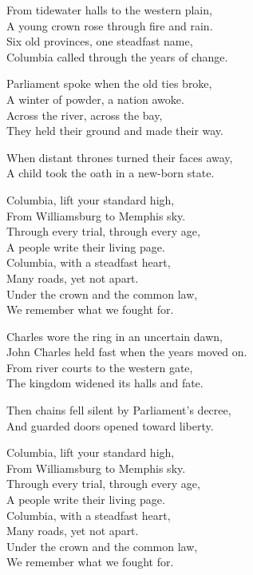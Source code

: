 \begin{lyrics}
From tidewater halls to the western plain,\\
A young crown rose through fire and rain.\\
Six old provinces, one steadfast name,\\
Columbia called through the years of change.

Parliament spoke when the old ties broke,\\
A winter of powder, a nation awoke.\\
Across the river, across the bay,\\
They held their ground and made their way.

When distant thrones turned their faces away,\\
A child took the oath in a new-born state.

Columbia, lift your standard high,\\
From Williamsburg to Memphis sky.\\
Through every trial, through every age,\\
A people write their living page.\\
Columbia, with a steadfast heart,\\
Many roads, yet not apart.\\
Under the crown and the common law,\\
We remember what we fought for.

Charles wore the ring in an uncertain dawn,\\
John Charles held fast when the years moved on.\\
From river courts to the western gate,\\
The kingdom widened its halls and fate.

Then chains fell silent by Parliament's decree,\\
And guarded doors opened toward liberty.

Columbia, lift your standard high,\\
From Williamsburg to Memphis sky.\\
Through every trial, through every age,\\
A people write their living page.\\
Columbia, with a steadfast heart,\\
Many roads, yet not apart.\\
Under the crown and the common law,\\
We remember what we fought for.


\end{lyrics}
